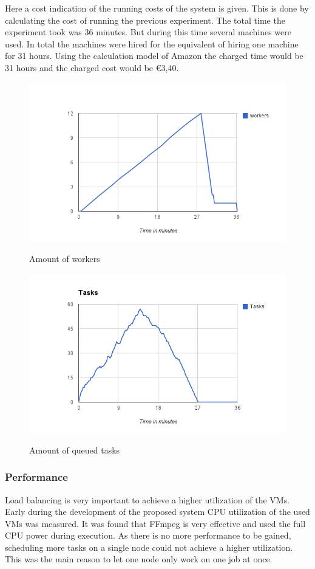 \documentclass[a4paper]{IEEEtran}
\begin{document}
Here a cost indication of the running costs of the system is given.
This is done by calculating the cost of running the previous experiment.
The total time the experiment took was 36 minutes.
But during this time several machines were used.
In total the machines were hired for the equivalent of hiring one machine for 31 hours.
Using the calculation model of Amazon the charged time would be 31 hours and the charged cost would be \euro 3,40.


\begin{figure}[ht]
	\includegraphics[scale=0.45]{fig/100workers.png}
	\label{fig:100-workers}
	\caption{Amount of workers}
\end{figure}

\begin{figure}[ht]
	\includegraphics[scale=0.45]{fig/100tasks.png}
	\label{fig:100-tasks}
	\caption{Amount of queued tasks}
\end{figure}

\subsubsection{Performance}
Load balancing is very important to achieve a higher utilization of the VMs.
Early during the development of the proposed system CPU utilization of the used VMs was measured.
It was found that FFmpeg is very effective and used the full CPU power during execution.
As there is no more performance to be gained, scheduling more tasks on a single node could not achieve a higher utilization.
This was the main reason to let one node only work on one job at once.
\end{document}
